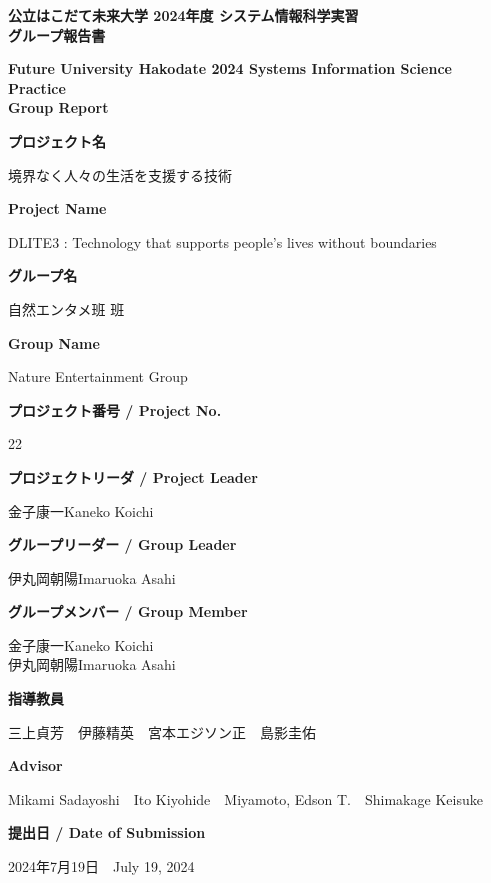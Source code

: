 \documentclass[12pt,a4paper]{report}
\newcommand{\AgendaBox}[2]{
    \large
    \textbf{#1}\\

    \vspace{0.2cm}

    \small 
    #2

    \vspace{0.5cm}
}
\newcommand{\NameBox}[2]{
    \small 
    #1\hspace{1cm}#2
}
\begin{document}
\thispagestyle{empty}
\begin{center}
    \large
    \textbf{
      公立はこだて未来大学 2024年度 システム情報科学実習\\
      グループ報告書
    }\\

    \vspace{0.2cm}

    \small 
    \textbf{
      Future University Hakodate 2024 Systems Information Science Practice\\Group Report
    }

    \vspace{0.5cm}

    \AgendaBox{プロジェクト名}{境界なく人々の生活を支援する技術}
    \AgendaBox{Project Name}{DLITE3 : Technology that supports people's lives without boundaries}
    \AgendaBox{グループ名}{自然エンタメ班 班}
    \AgendaBox{Group Name}{Nature Entertainment Group}
    \AgendaBox{プロジェクト番号 / Project No.}{22}
    \AgendaBox{プロジェクトリーダ / Project Leader}{金子康一\hspace{1cm}Kaneko Koichi}
    \AgendaBox{グループリーダー / Group Leader}{
      \NameBox{伊丸岡朝陽}{Imaruoka Asahi}\\
    }
    \AgendaBox{グループメンバー / Group Member}{
      \NameBox{金子康一}{Kaneko Koichi}\\
      \NameBox{伊丸岡朝陽}{Imaruoka Asahi}\\
    }
    \AgendaBox{指導教員}{
      三上貞芳　伊藤精英　宮本エジソン正　島影圭佑
    }
    \AgendaBox{Advisor}{
      Mikami Sadayoshi　Ito Kiyohide　Miyamoto, Edson T.　Shimakage Keisuke
    }
    \AgendaBox{提出日 / Date of Submission}{
      2024年7月19日　July 19, 2024
    }
    

\end{center}

\newpage
\thispagestyle{empty}
\mbox{}
\newpage

\clearpage
{}
\setcounter{page}{1}
\end{document}
